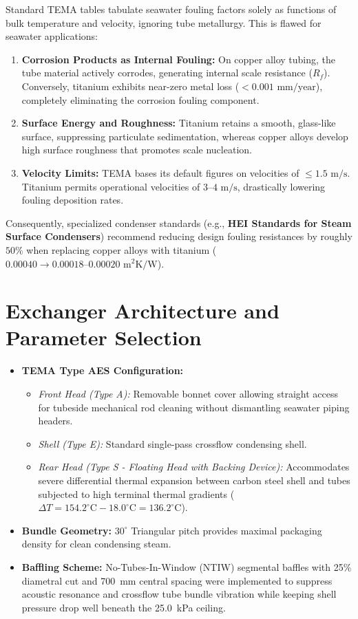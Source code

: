 \documentclass[12pt,a4paper]{article}
\begin{document}
Standard TEMA tables tabulate seawater fouling factors solely as functions of bulk temperature and velocity, ignoring tube metallurgy. This is flawed for seawater applications:
\begin{enumerate}
    \item \textbf{Corrosion Products as Internal Fouling:} On copper alloy tubing, the tube material actively corrodes, generating internal scale resistance ($R_f$). Conversely, titanium exhibits near-zero metal loss ($< 0.001\text{ mm/year}$), completely eliminating the corrosion fouling component.
    \item \textbf{Surface Energy and Roughness:} Titanium retains a smooth, glass-like surface, suppressing particulate sedimentation, whereas copper alloys develop high surface roughness that promotes scale nucleation.
    \item \textbf{Velocity Limits:} TEMA bases its default figures on velocities of $\le 1.5\text{ m/s}$. Titanium permits operational velocities of $3\text{--}4\text{ m/s}$, drastically lowering fouling deposition rates.
\end{enumerate}
Consequently, specialized condenser standards (e.g., \textbf{HEI Standards for Steam Surface Condensers}) recommend reducing design fouling resistances by roughly $50\%$ when replacing copper alloys with titanium ($0.00040 \to 0.00018\text{--}0.00020\text{ m}^2\text{K/W}$).

\section{Exchanger Architecture and Parameter Selection}

\begin{itemize}
    \item \textbf{TEMA Type AES Configuration:}
    \begin{itemize}
        \item \textit{Front Head (Type A):} Removable bonnet cover allowing straight access for tubeside mechanical rod cleaning without dismantling seawater piping headers.
        \item \textit{Shell (Type E):} Standard single-pass crossflow condensing shell.
        \item \textit{Rear Head (Type S - Floating Head with Backing Device):} Accommodates severe differential thermal expansion between carbon steel shell and tubes subjected to high terminal thermal gradients ($\Delta T = 154.2^\circ\text{C} - 18.0^\circ\text{C} = 136.2^\circ\text{C}$).
    \end{itemize}
    \item \textbf{Bundle Geometry:} $30^\circ$ Triangular pitch provides maximal packaging density for clean condensing steam.
    \item \textbf{Baffling Scheme:} No-Tubes-In-Window (NTIW) segmental baffles with 25\% diametral cut and 700~mm central spacing were implemented to suppress acoustic resonance and crossflow tube bundle vibration while keeping shell pressure drop well beneath the 25.0~kPa ceiling.
\end{itemize}
\end{document}
